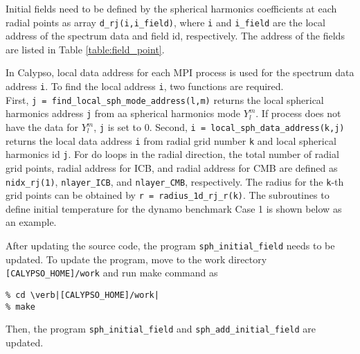 Initial fields need to be defined by the spherical harmonics coefficients at each radial points as array \verb|d_rj(i,i_field)|, where \verb|i| and \verb|i_field| are the local address of the spectrum data and field id, respectively. The address of the fields are listed in Table \ref{table:field_point}.

In Calypso, local data address for each MPI process is used for the spectrum data address \verb|i|. To find the local address \verb|i|, two functions are required. \\
First, \verb|j = find_local_sph_mode_address(l,m)| returns the local spherical  harmonics address \verb|j| from aa spherical harmonics mode $Y_{l}^{m}$. If process does not have the data for $Y_{l}^{m}$, \verb|j| is set to 0. Second, \verb|i = local_sph_data_address(k,j)| returns the local data address \verb|i| from radial grid number \verb|k| and local spherical harmonics id \verb|j|. For do loops in the radial direction, the total number of radial grid points, radial address for ICB, and radial address for CMB are defined as \verb|nidx_rj(1)|, \verb|nlayer_ICB|, and \verb|nlayer_CMB|, respectively. The radius for the \verb|k|-th grid points can be obtained by \verb|r = radius_1d_rj_r(k)|. The subroutines to define initial temperature for the dynamo benchmark Case 1 is shown below as an example.

After updating the source code, the program \verb|sph_initial_field| needs to be updated. To update the program, move to the work directory \verb|[CALYPSO_HOME]/work| and run make command as
% 
\begin{verbatim}
% cd \verb|[CALYPSO_HOME]/work|
% make
\end{verbatim}
%
Then, the program  \verb|sph_initial_field| and  \verb|sph_add_initial_field| are updated.

